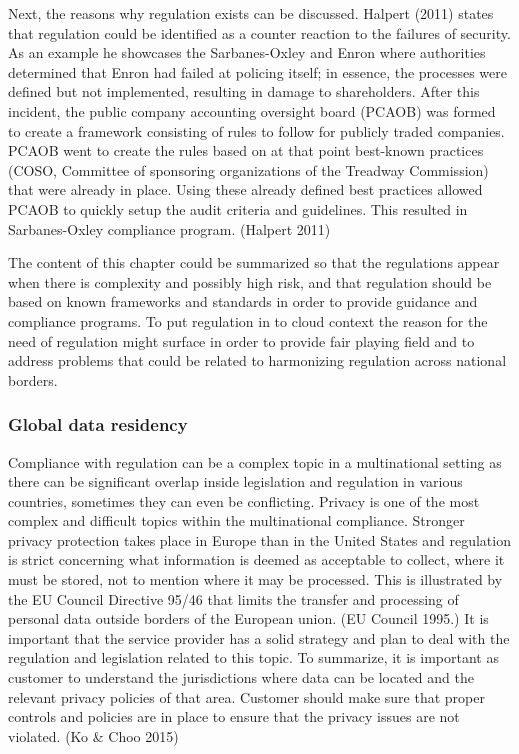 \documentclass{article}
\begin{document}
\par
Next, the reasons why regulation exists can be discussed. Halpert (2011) states that regulation could be identified as a counter reaction to the failures of security. As an example he showcases the Sarbanes-Oxley and Enron where authorities determined that Enron had failed at policing itself; in essence, the processes were defined but not implemented, resulting in damage to shareholders. After this incident, the public company accounting oversight board (PCAOB) was formed to create a framework consisting of rules to follow for publicly traded companies.
PCAOB went to create the rules based on at that point best-known practices (COSO, Committee of sponsoring organizations of the Treadway Commission) that were already in place. Using these already defined best practices allowed PCAOB to quickly setup the audit criteria and guidelines. This resulted in Sarbanes-Oxley compliance program. (Halpert 2011)
\par
The content of this chapter could be summarized so that the regulations appear when there is complexity and possibly high risk, and that regulation should be based on known frameworks and standards in order to provide guidance and compliance programs.
To put regulation in to cloud context the reason for the need of regulation might surface in order to provide fair playing field and to address problems that could be related to harmonizing regulation across national borders.
\subsubsection{Global data residency}
Compliance with regulation can be a complex topic in a multinational setting as there can be significant overlap inside legislation and regulation in various countries, sometimes they can even be conflicting. Privacy is one of the most complex and difficult topics within the multinational compliance. Stronger privacy protection takes place in Europe than in the United States and regulation is strict concerning what information is deemed as acceptable to collect, where it must be stored, not to mention where it may be processed. This is illustrated by the EU Council Directive 95/46 that limits the transfer and processing of personal data outside borders of the European union. (EU Council 1995.) It is important that the service provider has a solid strategy and plan to deal with the regulation and legislation related to this topic. To summarize, it is important as customer to understand the jurisdictions where data can be located and the relevant privacy policies of that area. Customer should make sure that proper controls and policies are in place to ensure that the privacy issues are not violated. (Ko \& Choo 2015)
\end{document}
